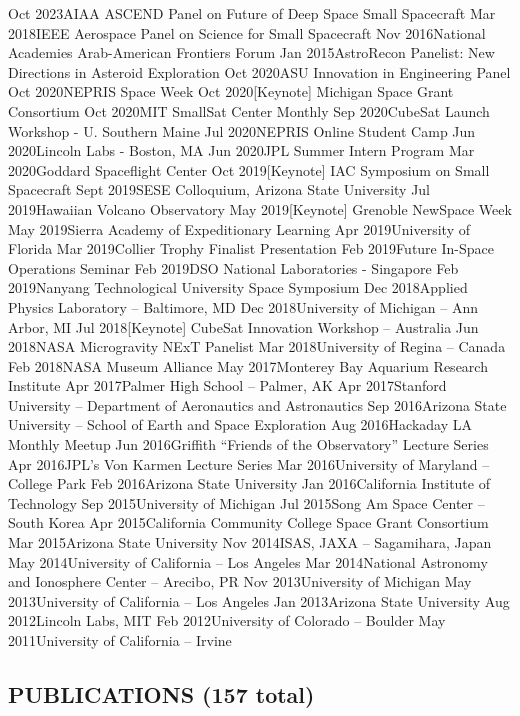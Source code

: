 \documentclass[11pt,letterpaper]{article}
\begin{document}
Oct 2023AIAA ASCEND Panel on Future of Deep Space Small Spacecraft
Mar 2018IEEE Aerospace Panel on Science for Small Spacecraft
Nov 2016National Academies Arab-American Frontiers Forum
Jan 2015AstroRecon Panelist: New Directions in Asteroid Exploration
Oct 2020ASU Innovation in Engineering Panel
Oct 2020NEPRIS Space Week
Oct 2020[Keynote] Michigan Space Grant Consortium
Oct 2020MIT SmallSat Center Monthly
Sep 2020CubeSat Launch Workshop - U. Southern Maine
Jul 2020NEPRIS Online Student Camp
Jun 2020Lincoln Labs - Boston, MA
Jun 2020JPL Summer Intern Program
Mar 2020Goddard Spaceflight Center
Oct 2019[Keynote] IAC Symposium on Small Spacecraft
Sept 2019SESE Colloquium, Arizona State University
Jul 2019Hawaiian Volcano Observatory
May 2019[Keynote] Grenoble NewSpace Week
May 2019Sierra Academy of Expeditionary Learning
Apr 2019University of Florida
Mar 2019Collier Trophy Finalist Presentation
Feb 2019Future In-Space Operations Seminar
Feb 2019DSO National Laboratories - Singapore
Feb 2019Nanyang Technological University Space Symposium
Dec 2018Applied Physics Laboratory – Baltimore, MD
Dec 2018University of Michigan – Ann Arbor, MI
Jul 2018[Keynote] CubeSat Innovation Workshop – Australia
Jun 2018NASA Microgravity NExT Panelist
Mar 2018University of Regina – Canada
Feb 2018NASA Museum Alliance
May 2017Monterey Bay Aquarium Research Institute
Apr 2017Palmer High School – Palmer, AK
Apr 2017Stanford University – Department of Aeronautics and Astronautics
Sep 2016Arizona State University – School of Earth and Space Exploration
Aug 2016Hackaday LA Monthly Meetup
Jun 2016Griffith “Friends of the Observatory” Lecture Series
Apr 2016JPL’s Von Karmen Lecture Series
Mar 2016University of Maryland – College Park
Feb 2016Arizona State University
Jan 2016California Institute of Technology
Sep 2015University of Michigan
Jul 2015Song Am Space Center – South Korea
Apr 2015California Community College Space Grant Consortium
Mar 2015Arizona State University
Nov 2014ISAS, JAXA – Sagamihara, Japan
May 2014University of California – Los Angeles
Mar 2014National Astronomy and Ionosphere Center – Arecibo, PR
Nov 2013University of Michigan
May 2013University of California – Los Angeles
Jan 2013Arizona State University
Aug 2012Lincoln Labs, MIT
Feb 2012University of Colorado – Boulder
May 2011University of California – Irvine


\subsection*{PUBLICATIONS (157 total)}
\end{document}
